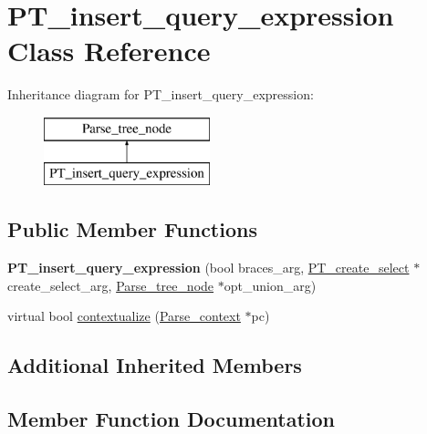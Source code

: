 \hypertarget{classPT__insert__query__expression}{}\section{P\+T\+\_\+insert\+\_\+query\+\_\+expression Class Reference}
\label{classPT__insert__query__expression}
Inheritance diagram for P\+T\+\_\+insert\+\_\+query\+\_\+expression\+:\begin{figure}[H]
\begin{center}
\leavevmode
\includegraphics[height=2.000000cm]{classPT__insert__query__expression}
\end{center}
\end{figure}
\subsection*{Public Member Functions}
\begin{DoxyCompactItemize}
\item 
\mbox{\label{classPT__insert__query__expression_a092a4bd17c6a57b1e25f0ff11b485f2d}} 
{\bfseries P\+T\+\_\+insert\+\_\+query\+\_\+expression} (bool braces\+\_\+arg, \mbox{\hyperlink{classPT__create__select}{P\+T\+\_\+create\+\_\+select}} $\ast$create\+\_\+select\+\_\+arg, \mbox{\hyperlink{classParse__tree__node}{Parse\+\_\+tree\+\_\+node}} $\ast$opt\+\_\+union\+\_\+arg)
\item 
virtual bool \mbox{\hyperlink{classPT__insert__query__expression_ab708c488b1d12ff1a12470feaf5093b8}{contextualize}} (\mbox{\hyperlink{structParse__context}{Parse\+\_\+context}} $\ast$pc)
\end{DoxyCompactItemize}
\subsection*{Additional Inherited Members}


\subsection{Member Function Documentation}
\mbox{\label{classPT__insert__query__expression_ab708c488b1d12ff1a12470feaf5093b8}} 
